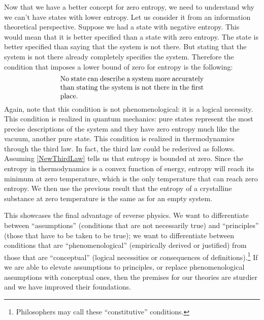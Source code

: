 \documentclass[10pt,twocolumn, nofootinbib]{revtex4-2}
\begin{document}
Now that we have a better concept for zero entropy, we need to understand why we can't have states with lower entropy. Let us consider it from an information theoretical perspective. Suppose we had a state with negative entropy. This would mean that it is better specified than a state with zero entropy. The state is better specified than saying that the system is not there. But stating that the system is not there already completely specifies the system. Therefore the condition that imposes a lower bound of zero for entropy is the following:
\begin{align}\label{NewThirdLaw}
	\parbox{2.8in}{No state can describe a system more accurately than stating the system is not there in the first place.}
\end{align}
Again, note that this condition is not phenomenological: it is a logical necessity. This condition is realized in quantum mechanics: pure states represent the most precise descriptions of the system and they have zero entropy much like the vacuum, another pure state. This condition is realized in thermodynamics through the third law. In fact, the third law could be rederived as follows. Assuming \eqref{NewThirdLaw} tells us that entropy is bounded at zero. Since the entropy in thermodynamics is a convex function of energy, entropy will reach its minimum at zero temperature, which is the only temperature that can reach zero entropy. We then use the previous result that the entropy of a crystalline substance at zero temperature is the same as for an empty system.

This showcases the final advantage of reverse physics. We want to differentiate between ``assumptions'' (conditions that are not necessarily true) and ``principles'' (those that have to be taken to be true); we want to differentiate between conditions that are ``phenomenological'' (empirically derived or justified) from those that are ``conceptual'' (logical necessities or consequences of definitions).\footnote{Philosophers may call these ``constitutive'' conditions.} If we are able to elevate assumptions to principles, or replace phenomenological assumptions with conceptual ones, then the premises for our theories are sturdier and we have improved their foundations.
\end{document}
